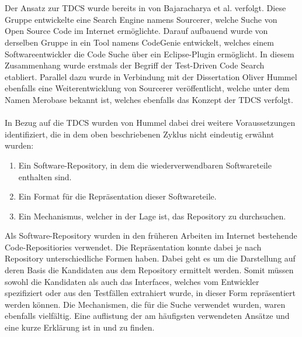 \\\\
Der Ansatz zur TDCS wurde bereits in \cite{sourcerer} von Bajaracharya et al.  verfolgt. Diese Gruppe entwickelte eine Search Engine namens Sourcerer, welche Suche von Open Source Code im Internet ermöglichte. Darauf aufbauend wurde von derselben Gruppe in \cite{Lemos} ein Tool namens CodeGenie entwickelt, welches einem Softwareentwickler die Code Suche über ein Eclipse-Plugin ermöglicht. In diesem Zusammenhang wurde erstmals der Begriff der Test-Driven Code Search etabliert. Parallel dazu wurde in Verbindung mit der Dissertation Oliver Hummel \cite{hummel08} ebenfalls eine Weiterentwicklung von Sourcerer veröffentlicht, welche unter dem Namen Merobase bekannt ist, welches ebenfalls das Konzept der TDCS verfolgt.
\\\\
In Bezug auf die TDCS wurden von Hummel\cite{hummel08} dabei drei weitere Voraussetzungen identifiziert, die in dem oben beschriebenen Zyklus nicht eindeutig erwähnt wurden:
\begin{enumerate}
\item Ein Software-Repository, in dem die wiederverwendbaren Softwareteile enthalten sind.
\item Ein Format für die Repräsentation dieser Softwareteile.
\item Ein Mechanismus, welcher in der Lage ist, das Repository zu durchsuchen.
\end{enumerate}
\noindent
Als Software-Repository wurden in den früheren Arbeiten im Internet bestehende Code-Repositiories verwendet. Die Repräsentation konnte dabei je nach Repository unterschiedliche Formen haben. Dabei geht es um die Darstellung auf deren Basis die Kandidaten aus dem Repository ermittelt werden. Somit müssen sowohl die Kandidaten als auch das Interfaces, welches vom Entwickler spezifiziert oder aus den Testfällen extrahiert wurde, in dieser Form repräsentiert werden können. Die Mechanismen, die für die Suche verwendet wurden, waren ebenfalls vielfältig. Eine auflistung der am häufigsten verwendeten Ansätze und eine kurze Erklärung ist in \cite{Hummel2013} und \cite{hummel08} zu finden.

